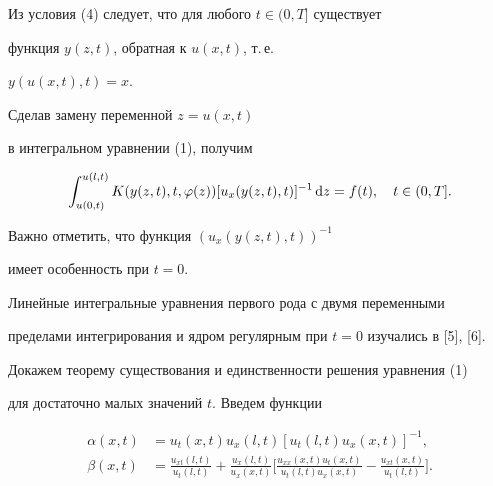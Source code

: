 Из условия (4) следует, что для любого $t\in ( 0,T]$ существует


функция $y(z,t)$, обратная к $u(x,t)$, т.\,е.


$y(u(x,t),t)=x$.


Сделав замену переменной $z=u(x,t)$


в интегральном уравнении (1), получим


\begin{equation}


\int_{u(0,t)}^{u(l,t)}K(y(z,t),t,\varphi


(z))[u_x(y(z,t),t)]^{-1}\d z=f(t),


\q t\in ( 0,T].




\end{equation}


Важно отметить, что функция $(u_x(y(z,t),t))^{-1}$


имеет особенность при $t=0$.


Линейные интегральные уравнения первого рода с двумя переменными


пределами интегрирования и ядром регулярным при $t=0$ изучались в [5], [6].





Докажем теорему существования и единственности решения уравнения (1)


для достаточно малых значений $t$. Введем функции


\begin{align}


\alpha (x,t)&=u_t(x,t)u_x(l,t)[u_t(l,t)u_x(x,t)]^{-1},




\\


\beta(x,t)&=\frac{u_{xt}(l,t)}{u_t(l,t)}+\frac{u_x(l,t)}{u_x(x,


t)}


\bigg[  \frac{u_{xx}(x,t)u_t(x,t)}{u_t(l,t)u_x(x,t)}-


\frac{u_{xt}(x,t)}{u_t(l,t)}\bigg].




\end{align}





